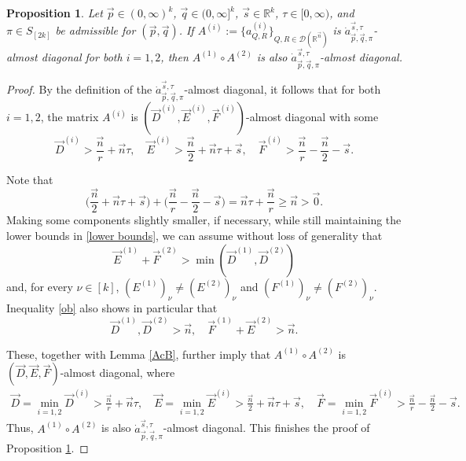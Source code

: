 \documentclass[11pt, reqno]{amsart}
\newtheorem{proposition}[theorem]{Proposition}
\theoremstyle{definition}
\theoremstyle{remark}
\numberwithin{equation}{section}
\newcommand{\vD}{\vec D}
\newcommand{\vE}{\vec E}
\newcommand{\vF}{\vec F}
\newcommand{\R}{\mathbb R}
\newcommand{\vnull}{\vec 0}
\newcommand{\vn}{\vec n}
\newcommand{\vp}{\vec p}
\newcommand{\vq}{\vec q}
\newcommand{\vs}{\vec s}
\begin{document}
\begin{proposition}\label{AcB2}
Let $\vp\in(0,\infty)^k$, $\vq\in(0,\infty]^k$, $\vs\in\R^k$,
$\tau\in[0,\infty)$, and $\pi\in S_{[2k]}$ be admissible for $(\vp,\vq)$.
If $A^{(i)}:=\{a^{(i)}_{Q,R}\}_{Q,R\in\mathscr{D}(\mathbb R^{\vec n})}$
is $\dot a^{\vec s,\tau}_{\vec p,\vec q,\pi}$-almost diagonal for both $i=1,2$, then
$A^{(1)}\circ A^{(2)}$ is also $\dot a^{\vec s,\tau}_{\vec p,\vec q,\pi}$-almost diagonal.
\end{proposition}

\begin{proof}
By the definition of the $\dot a^{\vec s,\tau}_{\vec p,\vec q,\pi}$-almost diagonal,
it follows that
for both $i=1,2$, the matrix $A^{(i)}$ is $(\vec D^{(i)},\vec E^{(i)},\vec F^{(i)})$-almost diagonal with some
\begin{equation}\label{lower bounds}
\vec D^{(i)}>\frac{\vn}{r}+\vn\tau,\quad
\vE^{(i)}>\frac{\vn}{2}+\vn\tau+\vs,\quad
\vF^{(i)}>\frac{\vn}{r}-\frac{\vn}{2}-\vs.
\end{equation}

Note that
\begin{equation}\label{ob}
\Big( \frac{\vn}{2}+\vn\tau+\vs\Big)
+\Big( \frac{\vn}{r}-\frac{\vn}{2}-\vs\Big)
=\vn\tau+\frac{\vn}{r}
\geq \vn > \vnull.
\end{equation}
Making some components slightly smaller, if necessary, while still maintaining the lower bounds in \eqref{lower bounds}, we can assume without loss of generality that
$$\vec E^{(1)}+\vec F^{(2)}>\min(\vec D^{(1)},\vec D^{(2)})$$
and, for every $\nu\in[k]$,
$(E^{(1)})_\nu \neq (E^{(2)})_\nu$ and $(F^{(1)})_\nu \neq (F^{(2)})_\nu$.
Inequality \eqref{ob} also shows in particular that
$$
\vec D^{(1)},\vec D^{(2)}>\vec n,\quad
\vec F^{(1)}+\vec E^{(2)}>\vec n.
$$

These, together with Lemma \ref{AcB}, further imply that
$A^{(1)}\circ A^{(2)}$ is $(\vD,\vE,\vF)$-almost diagonal,
where
\begin{equation*}
\begin{split}
\vD =\min_{i=1,2}\vec D^{(i)}>\frac{\vn}{r}+\vn\tau,\quad
\vE=\min_{i=1,2}\vec E^{(i)}>\frac{\vn}{2}+\vn\tau+\vs,\quad
\vF =\min_{i=1,2}\vec F^{(i)}>\frac{\vn}{r}-\frac{\vn}{2}-\vs.
\end{split}
\end{equation*}
Thus, $A^{(1)}\circ A^{(2)}$ is also $\dot a^{\vec s,\tau}_{\vec p,\vec q,\pi}$-almost diagonal.
This finishes the proof of Proposition \ref{AcB2}.
\end{proof}
\end{document}
